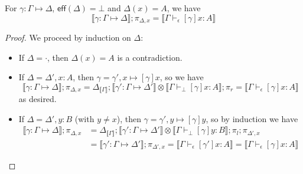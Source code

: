 \documentclass[acmsmall,screen,review]{acmart}
\newcommand{\ms}[1]{\ensuremath{\mathsf{#1}}}
\newcommand{\hasty}[4]{#1 \vdash_{#2} #3: {#4}}
\newcommand{\issubst}[3]{#1: #2 \mapsto #3}
\newcommand{\dnt}[1]{\llbracket{#1}\rrbracket}
\begin{document}
\begin{lemma}
  For $\issubst{\gamma}{\Gamma}{\Delta}$, $\ms{eff}(\Delta) = \bot$ and $\Delta(x) = A$, we have
  \begin{equation}
    \dnt{\issubst{\gamma}{\Gamma}{\Delta}};\pi_{\Delta, x} 
    = \dnt{\hasty{\Gamma}{\epsilon}{[\gamma]x}{A}}
  \end{equation}
  \label{lem:subst-proj}
\end{lemma}
\begin{proof}
  We proceed by induction on $\Delta$:
  \begin{itemize}[leftmargin=*]
    \item If $\Delta = \cdot$, then $\Delta(x) = A$ is a contradiction.
    \item If $\Delta = \Delta', x : A$, then $\gamma = \gamma', x \mapsto [\gamma]x$, so we have 
    \begin{equation}
      \dnt{\issubst{\gamma}{\Gamma}{\Delta}};\pi_{\Delta, x} =
      \Delta_{\dnt{\Gamma}}
      ; \dnt{\issubst{\gamma'}{\Gamma}{\Delta'}} \otimes \dnt{\hasty{\Gamma}{\bot}{[\gamma]x}{A}}
      ; \pi_r
      = \dnt{\hasty{\Gamma}{\epsilon}{[\gamma]x}{A}}
    \end{equation}
    as desired.
    \item If $\Delta = \Delta', y : B$ (with $y \neq x$), then $\gamma = \gamma', y \mapsto
    [\gamma]y$, so by induction we have
    \begin{equation}
      \begin{aligned}
      \dnt{\issubst{\gamma}{\Gamma}{\Delta}};\pi_{\Delta, x} 
      & = \Delta_{\dnt{\Gamma}}
       ; \dnt{\issubst{\gamma'}{\Gamma}{\Delta'}} \otimes \dnt{\hasty{\Gamma}{\bot}{[\gamma]y}{B}}
       ; \pi_l ; \pi_{\Delta', x} \\
      & = \dnt{\issubst{\gamma'}{\Gamma}{\Delta'}} ; \pi_{\Delta', x}
        = \dnt{\hasty{\Gamma}{\epsilon}{[\gamma']x}{A}}
        = \dnt{\hasty{\Gamma}{\epsilon}{[\gamma]x}{A}}
      \end{aligned}
    \end{equation}
  \end{itemize}
\end{proof}

\soundnesssubst*

\label{proof:soundness-subst}
\end{document}
